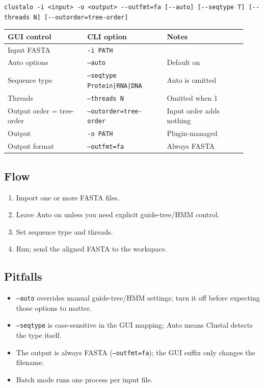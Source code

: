 \documentclass[11pt]{report}
\begin{document}
\begin{lstlisting}
clustalo -i <input> -o <output> --outfmt=fa [--auto] [--seqtype T] [--threads N] [--outorder=tree-order]
\end{lstlisting}

{\footnotesize
\begin{longtable}{@{}>{\raggedright\arraybackslash}p{0.31\linewidth}>{\raggedright\arraybackslash}p{0.31\linewidth}>{\raggedright\arraybackslash}p{0.31\linewidth}@{}}
\toprule
GUI control & CLI option & Notes \\
\midrule
\endhead
Input FASTA & \texttt{-i PATH} &  \\
Auto options & \texttt{--auto} & Default on \\
Sequence type & \texttt{--seqtype Protein|\allowbreak RNA|\allowbreak DNA} & Auto is omitted \\
Threads & \texttt{--threads N} & Omitted when 1 \\
Output order = tree-order & \texttt{--outorder=tree-order} & Input order adds nothing \\
Output & \texttt{-o PATH} & Plugin-managed \\
Output format & \texttt{--outfmt=fa} & Always FASTA \\
\bottomrule
\end{longtable}
}

\subsection{Flow}

\begin{enumerate}
  \item Import one or more FASTA files.
  \item Leave Auto on unless you need explicit guide-tree/HMM control.
  \item Set sequence type and threads.
  \item Run; send the aligned FASTA to the workspace.
\end{enumerate}

\subsection{Pitfalls}

\begin{itemize}
  \item \texttt{--auto} overrides manual guide-tree/HMM settings; turn it off before expecting those options to matter.
  \item \texttt{--seqtype} is case-sensitive in the GUI mapping; Auto means Clustal detects the type itself.
  \item The output is always FASTA (\texttt{--outfmt=fa}); the GUI suffix only changes the filename.
  \item Batch mode runs one process per input file.
\end{itemize}
\end{document}
